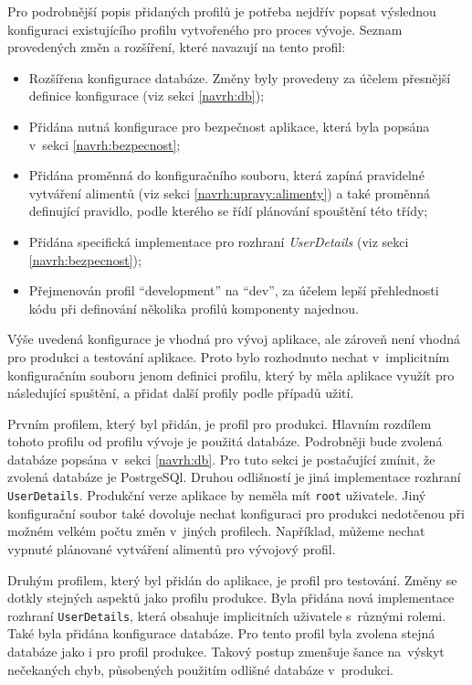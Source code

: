     Pro podrobnější popis přidaných profilů je potřeba nejdřív popsat výslednou konfiguraci existujícího profilu vytvořeného pro proces vývoje. Seznam provedených změn a rozšíření, které navazují na tento profil:
    \begin{itemize}
            \item Rozšířena konfigurace databáze. Změny byly provedeny za účelem přesnější definice konfigurace (viz sekci \ref{navrh:db});
            \item Přidána nutná konfigurace pro bezpečnost aplikace, která byla popsána v~sekci \ref{navrh:bezpecnost};
            \item Přidána proměnná do konfiguračního souboru, která zapíná pravidelné vytváření alimentů (viz sekci \ref{navrh:upravy:alimenty}) a také proměnná definující pravidlo, podle kterého se řídí plánování spouštění této třídy;
            \item Přidána specifická implementace pro rozhraní \textit{UserDetails} (viz sekci \ref{navrh:bezpecnost});
            \item Přejmenován profil \enquote{development} na \enquote{dev}, za účelem lepší přehlednosti kódu při definování několika profilů komponenty najednou.
    \end{itemize}
    
    Výše uvedená konfigurace je vhodná pro vývoj aplikace, ale zároveň není vhodná pro produkci a testování aplikace. Proto bylo rozhodnuto nechat v~implicitním konfiguračním souboru jenom definici profilu, který by měla aplikace využít pro následující spuštění, a přidat další profily podle případů užití.
    
    Prvním profilem, který byl přidán, je profil pro produkci. Hlavním rozdílem tohoto profilu od profilu vývoje je použitá databáze. Podrobněji bude zvolená databáze popsána v~sekci \ref{navrh:db}. Pro tuto sekci je postačující zmínit, že zvolená databáze je PostrgeSQl. Druhou odlišností je jiná implementace rozhraní \verb|UserDetails|. Produkční verze aplikace by neměla mít \verb|root| uživatele. Jiný konfigurační soubor také dovoluje nechat konfiguraci pro produkci nedotčenou při možném velkém počtu změn v~jiných profilech.
    Například, můžeme nechat vypnuté plánované vytváření alimentů pro vývojový profil.
    
    Druhým profilem, který byl přidán do aplikace, je profil pro testování. Změny se dotkly stejných aspektů jako profilu produkce. Byla přidána nová implementace rozhraní \verb|UserDetails|, která obsahuje implicitních uživatele s~různými rolemi. Také byla přidána konfigurace databáze. Pro tento profil byla zvolena stejná databáze jako i pro profil produkce. Takový postup zmenšuje šance na~výskyt nečekaných chyb, působených použitím odlišné databáze v~produkci.
    
